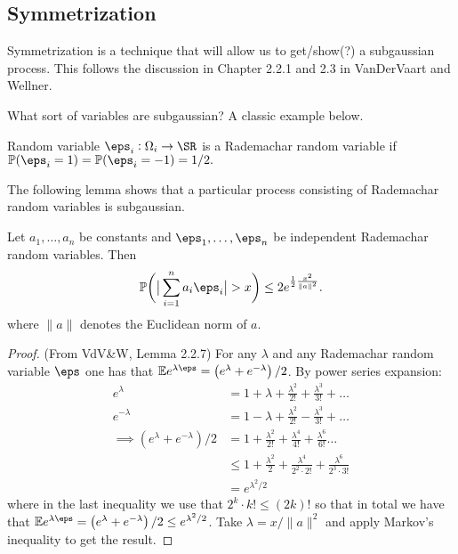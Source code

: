 \subsection{Symmetrization}%
\label{subsec:symmetrization}

Symmetrization is a technique that will allow us to get/show(?) a subgaussian process. This follows the discussion in Chapter 2.2.1 and 2.3 in VanDerVaart and Wellner.

What sort of variables are subgaussian? A classic example below.

\begin{definition}
	\label{def:rademachar}
	Random variable \(\eps_i:\Omega_i\to\SR\) is a Rademachar random variable if
	\(\P(\eps_i=1)=\P(\eps_i=-1)=1/2.\) 
\end{definition}

The following lemma shows that a particular process consisting of Rademachar random variables is subgaussian.

\begin{lemma}
	\label{lemma:hoeffding}
	Let \(a_1,\dots,a_n\) be constants and \(\eps_1,\dots,\eps_n\) be independent Rademachar random variables. Then 
	\[
		\P\bigg(\big|\sum_{i=1}^n a_i\eps_i\big| > x\bigg) \leq 2e^{\frac{1}{2}\frac{x^2}{\|a\|^2}  }
	.\] 
	where \(\|a\|\) denotes the Euclidean norm of \(a\).
\end{lemma}
\begin{proof}
	(From VdV\&W, Lemma 2.2.7) For any \(\lambda\) and any Rademachar random variable \(\eps\) one has that  \(\E e^{\lambda\eps} = \left(e^\lambda+e^{-\lambda}\right)/2\). By power series expansion:
	\begin{align*}
		e^\lambda &= 1 + \lambda + \frac{\lambda^2}{2!} + \frac{\lambda^3}{3!} +\dots \\ 
		e^{-\lambda} &= 1 - \lambda + \frac{\lambda^2}{2!} - \frac{\lambda^3}{3!}+\dots \\
		\implies \left(e^{\lambda} + e^{-\lambda}\right)/2 &= 1 + \frac{\lambda^2}{2!} + \frac{\lambda^4}{4!} + \frac{\lambda^6}{6!} \dots \\
														 &\leq 1 + \frac{\lambda^2}{2} + \frac{\lambda^4}{2^2\cdot2!} + \frac{\lambda^6}{2^3\cdot3!}   \\
														 &= e^{\lambda^2/2}
	\end{align*}
	where in the last inequality we use that \(2^k\cdot k! \leq (2k)!\) so that in total we have that \(\E e^{\lambda\eps} = \left(e^\lambda + e^{-\lambda}\right)/2 \leq e^{\lambda^2/2}\). Take \(\lambda = x/\|a\|^2\) and apply Markov's inequality to get the result.
\end{proof}


